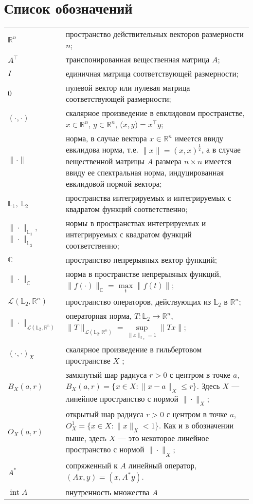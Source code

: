 \documentclass[../main.tex]{subfiles}
\begin{document}
\clearpage
\section*{Список обозначений}
\begin{tabularx}{\textwidth}{lY}
 $\mathbb{R}^n$ & пространство действительных векторов размерности $n$; \\ 
 $A^{\top}$ & транспонированная вещественная матрица $A$; \\ 
 $I$ & единичная матрица соответствующей размерности; \\ 
 $0$ & нулевой вектор или нулевая матрица соответствующей размерности; \\
 $(\cdot,\cdot)$ & скалярное произведение в евклидовом пространстве, $x \in \mathbb{R}^n$, $y \in \mathbb{R}^n$, $ \Big(x, y\Big) = x^{\top} y$; \\
 $\| \cdot\| $ & норма, в случае вектора $x \in \mathbb{R}^n$ имеется ввиду евклидова норма, т.е. $\|x\| = (x,x)^{\frac{1}{2}}$, а в случае вещественной матрицы $A$ размера $n \times n$ имеется ввиду ее спектральная норма, индуцированная евклидовой нормой вектора; \\
 $\mathbb{L}_1$, $\mathbb{L}_2$ & пространства интегрируемых и интегрируемых с квадратом функций соответственно; \\
 $\|\cdot\|_{\mathbb{L}_1}$, $\|\cdot\|_{\mathbb{L}_2}$ & нормы в пространствах интегрируемых и интегрируемых с квадратом функций соответственно; \\
 $ \mathbb{C} $ & пространство непрерывных вектор-функций; \\
 $\|\cdot\|_\mathbb{C}$ & норма в пространстве непрерывных функций, $\|f(\cdot) \|_\mathbb{C} = \max\limits_{t} \|f(t)\|$; \\
 $\mathcal{L}(\mathbb{L}_2, \mathbb{R}^n)$ & пространство операторов, действующих из $\mathbb{L}_2$ в $\mathbb{R}^n$; \\ 
 $\| \cdot \|_{\mathcal{L}(\mathbb{L}_2, \mathbb{R}^n)}$ & операторная норма, $T: \mathbb{L}_2 \to \mathbb{R}^n $, $\| T \|_{\mathcal{L}(\mathbb{L}_2, \mathbb{R}^n)} = \sup\limits_{\|x\|_{\mathbb{L}_2} = 1} \| T x \| $;\\
 $(\cdot,\cdot)_{X}$ & скалярное произведение в гильбертовом пространстве $X$ ; \\
 $B_X(a,r)$ & замкнутый шар радиуса $r>0$ с центром в точке $a$, $B_X(a, r) = \{x\in X: \|x-a\|_X \leqslant r \}$. Здесь $X$ --- линейное пространство с нормой $\|\cdot\|_X$; \\
 $O_{X}(a, r)$ & открытый шар радиуса $r>0$ с центром в точке $a$, $O_{X}^1 = \{x\in X: \|x\|_{X} < 1 \}$. Как и в обозначении выше, здесь $X$ --- это некоторое линейное пространство с нормой $\|\cdot\|_X$; \\
 $ A^* $ & сопряженный к $A$ линейный оператор, $(Ax, y) = (x, A^*y)$. \\
 $ \operatorname{int}A $ & внутренность множества $A$ \\
\end{tabularx}
\end{document}
